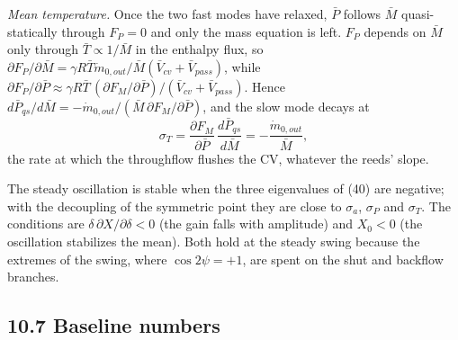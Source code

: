 \emph{Mean temperature.} Once the two fast modes have relaxed, $\bar P$ follows $\bar M$ quasi-statically through $F_P = 0$ and only the mass equation is left. $F_P$ depends on $\bar M$ only through $\bar T \propto 1/\bar M$ in the enthalpy flux, so $\partial F_P/\partial\bar M = \gamma R\bar T\dot m_{0,out}/\bar M(\bar V_{cv} + \bar V_{pass})$, while $\partial F_P/\partial\bar P \approx \gamma R\bar T\,(\partial F_M/\partial\bar P)/(\bar V_{cv} + \bar V_{pass})$. Hence $d\bar P_{qs}/d\bar M = -\dot m_{0,out}/(\bar M\,\partial F_M/\partial\bar P)$, and the slow mode decays at
\begin{equation}
\sigma_T = \frac{\partial F_M}{\partial\bar P}\,\frac{d\bar P_{qs}}{d\bar M} = -\frac{\dot m_{0,out}}{\bar M} , \tag{43}
\end{equation}
the rate at which the throughflow flushes the CV, whatever the reeds' slope.

The steady oscillation is stable when the three eigenvalues of (40) are negative; with the decoupling of the symmetric point they are close to $\sigma_a$, $\sigma_P$ and $\sigma_T$. The conditions are $\delta\,\partial X/\partial\delta < 0$ (the gain falls with amplitude) and $X_0 < 0$ (the oscillation stabilizes the mean). Both hold at the steady swing because the extremes of the swing, where $\cos 2\psi = +1$, are spent on the shut and backflow branches.

\subsection*{10.7 Baseline numbers}

